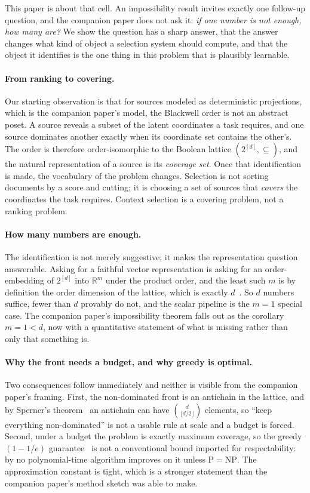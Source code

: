 \documentclass[11pt]{article}
\theoremstyle{plain}
\theoremstyle{definition}
\theoremstyle{remark}
\begin{document}
This paper is about that cell. An impossibility result invites exactly one follow-up question, and
the companion paper does not ask it: \emph{if one number is not enough, how many are?} We show the
question has a sharp answer, that the answer changes what kind of object a selection system should
compute, and that the object it identifies is the one thing in this problem that is plausibly
learnable.

\paragraph{From ranking to covering.}
Our starting observation is that for sources modeled as deterministic projections, which is the
companion paper's model, the Blackwell order is not an abstract poset. A source reveals a subset of
the latent coordinates a task requires, and one source dominates another exactly when its
coordinate set contains the other's. The order is therefore order-isomorphic to the Boolean lattice
$(2^{[d]},\subseteq)$, and the natural representation of a source is its \emph{coverage set}. Once
that identification is made, the vocabulary of the problem changes. Selection is not sorting
documents by a score and cutting; it is choosing a set of sources that \emph{covers} the
coordinates the task requires. Context selection is a covering problem, not a ranking problem.

\paragraph{How many numbers are enough.}
The identification is not merely suggestive; it makes the representation question answerable.
Asking for a faithful vector representation is asking for an order-embedding of $2^{[d]}$ into
$\mathbb{R}^m$ under the product order, and the least such $m$ is by definition the order dimension
of the lattice, which is exactly $d$~\citep{dushnik1941,trotter1992}. So $d$ numbers suffice, fewer
than $d$ provably do not, and the scalar pipeline is the $m=1$ special case. The companion paper's
impossibility theorem falls out as the corollary $m=1 < d$, now with a quantitative statement of
what is missing rather than only that something is.

\paragraph{Why the front needs a budget, and why greedy is optimal.}
Two consequences follow immediately and neither is visible from the companion paper's framing.
First, the non-dominated front is an antichain in the lattice, and by Sperner's
theorem~\citep{sperner1928} an antichain can have $\binom{d}{\lfloor d/2 \rfloor}$ elements, so
``keep everything non-dominated'' is not a usable rule at scale and a budget is forced. Second,
under a budget the problem is exactly maximum coverage, so the greedy $(1-1/e)$
guarantee~\citep{nemhauser1978} is not a conventional bound imported for respectability: by
\citet{feige1998} no polynomial-time algorithm improves on it unless $\mathrm{P}=\mathrm{NP}$. The
approximation constant is tight, which is a stronger statement than the companion paper's method
sketch was able to make.
\end{document}
